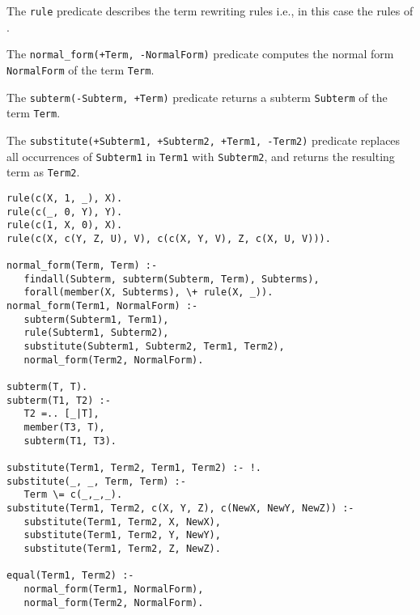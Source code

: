 \documentclass[a4paper,twoside,openright]{report}
\begin{document}
The \verb|rule| predicate describes the term rewriting rules i.e., in this case the rules of .

The \verb|normal_form(+Term, -NormalForm)| predicate computes the normal form \verb|NormalForm| of the term \verb|Term|.

The \verb|subterm(-Subterm, +Term)| predicate returns a subterm \verb|Subterm| of the term \verb|Term|. 

The \verb|substitute(+Subterm1, +Subterm2, +Term1, -Term2)| predicate replaces all occurrences of \verb|Subterm1| in \verb|Term1| with \verb|Subterm2|, and returns the resulting term as \verb|Term2|.
 
\begin{verbatim}
rule(c(X, 1, _), X).
rule(c(_, 0, Y), Y).
rule(c(1, X, 0), X).
rule(c(X, c(Y, Z, U), V), c(c(X, Y, V), Z, c(X, U, V))).

normal_form(Term, Term) :-
   findall(Subterm, subterm(Subterm, Term), Subterms),
   forall(member(X, Subterms), \+ rule(X, _)).
normal_form(Term1, NormalForm) :-
   subterm(Subterm1, Term1),
   rule(Subterm1, Subterm2),
   substitute(Subterm1, Subterm2, Term1, Term2),
   normal_form(Term2, NormalForm).

subterm(T, T).
subterm(T1, T2) :-
   T2 =.. [_|T],
   member(T3, T),
   subterm(T1, T3).

substitute(Term1, Term2, Term1, Term2) :- !.
substitute(_, _, Term, Term) :-
   Term \= c(_,_,_).
substitute(Term1, Term2, c(X, Y, Z), c(NewX, NewY, NewZ)) :-
   substitute(Term1, Term2, X, NewX),
   substitute(Term1, Term2, Y, NewY),
   substitute(Term1, Term2, Z, NewZ).

equal(Term1, Term2) :-
   normal_form(Term1, NormalForm),
   normal_form(Term2, NormalForm).
\end{verbatim}







\end{document}
